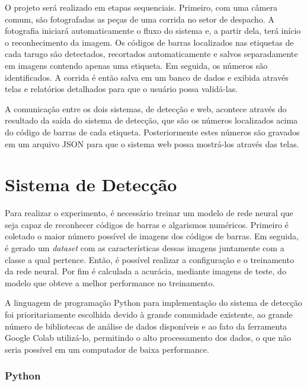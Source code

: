 O projeto será realizado em etapas sequenciais. Primeiro, com uma câmera comum, são fotografadas as peças de uma corrida no setor de despacho. A fotografia iniciará automaticamente o fluxo do sistema e, a partir dela, terá início o reconhecimento da imagem. Os códigos de barras localizados nas etiquetas de cada tarugo são detectados, recortados automaticamente e salvos separadamente em imagens contendo apenas uma etiqueta. Em seguida, os números são identificados. A corrida é então salva em um banco de dados e exibida através telas e relatórios detalhados para que o usuário possa validá-las.

A comunicação entre os dois sistemas, de detecção e web, acontece através do resultado da saída do sistema de detecção, que são os números localizados acima do código de barras de cada etiqueta. Posteriormente estes números são  gravados em um arquivo JSON para que o sistema web possa mostrá-los através das telas. 


\section{Sistema de Detecção} \label{sec:backend}

Para realizar o experimento, é necessário treinar um modelo de rede neural que seja capaz de reconhecer códigos de barras e algarismos numéricos. Primeiro é coletado o maior número possível de imagens dos códigos de barras. Em seguida, é gerado um \textit{dataset} com as características dessas imagens juntamente com a classe a qual pertence. Então, é possível realizar a configuração e o treinamento da rede neural. Por fim é calculada a acurácia, mediante imagens de teste, do modelo que obteve a melhor performance no treinamento.

A linguagem de programação Python para implementação do sistema de detecção foi prioritariamente escolhida devido à grande comunidade existente, ao grande número de bibliotecas de análise de dados disponíveis e ao fato da ferramenta Google Colab utilizá-lo, permitindo o alto processamento dos dados, o que não seria possível em um computador de baixa performance.


\subsubsection{Python}

